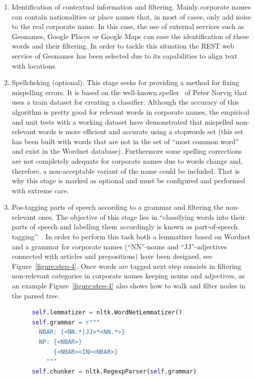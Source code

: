 \documentclass{llncs}
\begin{document}
\begin{enumerate}
\item Identification of contextual information and filtering. Mainly corporate names can contain nationalities or place names that, in most of 
cases, only add noise to the real corporate name. In this case, the use of external services such as Geonames, Google Places 
or Google Maps can ease the identification of these words and their filtering. In order to tackle this situation the REST web service 
of Geonames has been selected due to its capabilities to align text with locations.

\item Spellcheking (optional). This stage seeks for providing a method for fixing mispelling errors. It is based on the 
well-known speller~\cite{NorvigSpelling} of Peter Norvig that uses a train dataset for creating a classifier. Although the accuracy of this 
algorithm is pretty good for relevant words in corporate names, the empirical and unit tests with a working dataset 
have demonstrated that mispelled non-relevant words is more efficient and accurate using a stopwords set (this set has been 
built with words that are not in the set of ``most common word'' and exist in the Wordnet database). Furthermore some spelling corrections 
are not completely adequate for corporate names due to words change and, therefore, a non-acceptable variant of the name 
could be included. That is why this stage is marked as optional and must be configured and performed with extreme care.

\item Pos-tagging parts of speech according to a grammar and filtering the non-relevant ones. The objective 
of this stage lies in ``classifying words into their parts of speech and labelling them accordingly is known as part-of-speech tagging''~\cite{LoperBird02}. In order 
to perform this task both a lemmatizer based on Wordnet and a grammar for corporate names (``NN''-nouns and ``JJ''-adjectives connected with articles and 
prepositions) have been designed, see Figure~\ref{figure:step-4}. Once words are tagged next step consists in filtering non-relevant categories 
in corporate names keeping nouns and adjectives, as an example Figure~\ref{figure:step-4} also shows how to walk and filter nodes in the parsed tree.

\begin{figure}[!h]
\begin{center}
\begin{lstlisting}[language=Python]  
self.lemmatizer = nltk.WordNetLemmatizer()
self.grammar = r"""
  NBAR: {<NN.*|JJ>*<NN.*>}   
  NP: {<NBAR>}
      {<NBAR><IN><NBAR>} 
    """
self.chunker = nltk.RegexpParser(self.grammar)


\end{lstlisting}
\end{center}
\end{figure}
\end{enumerate}
\end{document}

